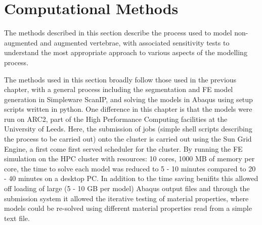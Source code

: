 \section{Computational Methods}

The methods described in this section describe the process used to model
non-augmented and augmented vertebrae, with associated sensitivity tests to
understand the most appropriate approach to various aspects of the modelling
process.


The methods used in this section broadly follow those used in the previous
chapter, with a general process including the segmentation and FE model
generation in Simpleware ScanIP, and solving the models in Abaqus using setup
scripts written in python. One difference in this chapter is that the models
were run on ARC2, part of the High Performance Computing facilities at the
University of Leeds. Here, the submission of jobs (simple shell scripts
describing the process to be carried out) onto the cluster is carried out using
the Sun Grid
Engine, a first come first served scheduler for the cluster. By running the FE
simulation on the HPC cluster with resources: 10 cores, 1000 MB of memory per
core, the time to solve each model was reduced to 5 - 10 minutes compared to 20
- 40 minutes on a desktop PC. In addition to the time saving benifits this
allowed off loading of large (5 - 10 GB per model) Abaqus output files and
through the submission system it allowed the iterative testing of material
properties, where models could be re-solved using different material properties
read from a simple text file.

